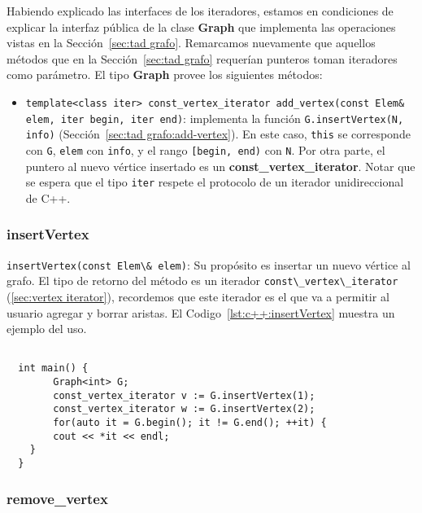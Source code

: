 \documentclass[%
    a4paper,%
    12pt,%
    twoside,%
    openright,%
    halfparskip,%
    cleardoubleempty,%
    bigheadings,%
    titlepage,%
    headsepline%
]{scrbook}
\makeatletter
\newcommand{\Code}[1]{\lstinline[basicstyle={\tt}]@#1@}
\makeatother
\begin{document}
Habiendo explicado las interfaces de los iteradores, estamos en condiciones de explicar la interfaz pública de la clase \textbf{Graph} que implementa las operaciones vistas en la Sección~\ref{sec:tad grafo}.  Remarcamos nuevamente que aquellos métodos que en la Sección~\ref{sec:tad grafo} requerían punteros toman iteradores como parámetro.  El tipo \textbf{Graph} provee los siguientes métodos:
%
\begin{itemize}
  \item \Code{template<class iter> const_vertex_iterator add_vertex(const Elem& elem, iter begin, iter end)}: implementa la función \Code{G.insertVertex(N, info)} (Sección~\ref{sec:tad grafo:add-vertex}).  En este caso, \Code{this} se corresponde con \Code{G}, \Code{elem} con \Code{info}, y el rango \Code{[begin, end)} con \Code{N}.  Por otra parte, el puntero al nuevo vértice insertado es un \textbf{const\_vertex\_iterator}.  Notar que se espera que el tipo \Code{iter} respete el protocolo de un iterador unidireccional de C++.
\end{itemize}


\subsubsection{insertVertex}
\label{sec:insertVertex}
\Code{insertVertex(const Elem\& elem)}: Su propósito es insertar un nuevo vértice al grafo.
El tipo de retorno del método es un iterador \Code{const\_vertex\_iterator} (\ref{sec:vertex iterator}), recordemos que este iterador es el que va a permitir al usuario agregar y borrar aristas. El Codigo~\ref{lst:c++:insertVertex} muestra un ejemplo del uso.

\begin{lstlisting}[caption={Ejemplo de uso de insertVertex.  Crea un grafo $G$ de tipo entero con dos vértices, uno con el entero 1 y el otro con el entero 2 como información.  Luego, el ciclo imprime ``1 2''. Ver Sección~\ref{sec:vertex iterator} para más información de \texttt{vertex\_iterator}.},gobble=2,float=ht,label={lst:c++:insertVertex},emph={insert_vertex}]
 
  int main() {
        Graph<int> G;
        const_vertex_iterator v := G.insertVertex(1);
        const_vertex_iterator w := G.insertVertex(2);
        for(auto it = G.begin(); it != G.end(); ++it) {
        cout << *it << endl;
    }
  }
\end{lstlisting}

\subsubsection{remove\_vertex}
\label{sec:remove-vertex}
\end{document}
